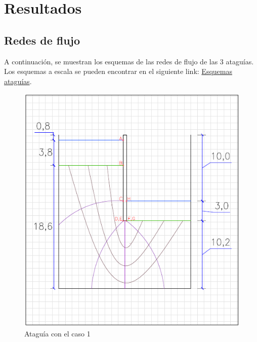 \documentclass{article}
\begin{document}
\section{Resultados}
\subsection{Redes de flujo}
A continuación, se muestran los esquemas de las redes de flujo de las 3 ataguías. Los esquemas a escala se pueden encontrar en el siguiente link: \href{https://github.com/berckanala/Proyecto-1-MCOC/tree/main/redes_flujo}{Esquemas ataguías}.

\begin{figure}[h]
    \centering
    \begin{minipage}{0.32\textwidth}
        \centering
        \includegraphics[width=\textwidth]{graficos/At_caso1.png}
        \caption{Ataguía con el caso 1}
        \label{fig:At_caso1}
    \end{minipage}
    \hfill
    \begin{minipage}{0.32\textwidth}
        \centering

\end{minipage}
\end{figure}
\end{document}

